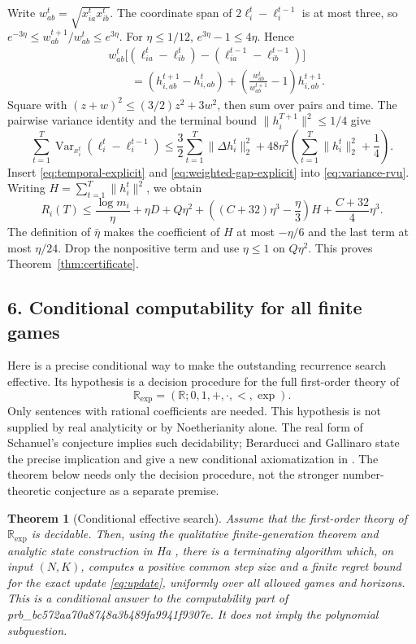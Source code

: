 \documentclass[11pt]{article}
\newtheorem{theorem}{Theorem}
\newcommand{\Var}{\operatorname{Var}}
\newcommand{\norm}[1]{\lVert #1\rVert}
\begin{document}
Write $w_{ab}^t=\sqrt{x_{ia}^tx_{ib}^t}$. The coordinate span of
$2\ell_i^t-\ell_i^{t-1}$ is at most three, so
$e^{-3\eta}\leq w_{ab}^{t+1}/w_{ab}^t\leq e^{3\eta}$.
For $\eta\leq1/12$, $e^{3\eta}-1\leq4\eta$. Hence
\begin{align*}
 &w_{ab}^t\bigl[(\ell_{ia}^t-\ell_{ib}^t)
                   -(\ell_{ia}^{t-1}-\ell_{ib}^{t-1})\bigr]\\
 &\qquad=(h_{i,ab}^{t+1}-h_{i,ab}^t)
       +\left(\frac{w_{ab}^t}{w_{ab}^{t+1}}-1\right)h_{i,ab}^{t+1}.
\end{align*}
Square with $(z+w)^2\leq(3/2)z^2+3w^2$, then sum over pairs and time.
The pairwise variance identity and the terminal bound
$\norm{h_i^{T+1}}^2\leq1/4$ give
\begin{equation}\label{eq:weighted-gap-explicit}
 \sum_{t=1}^T\Var_{x_i^t}(\ell_i^t-\ell_i^{t-1})
 \leq\frac32\sum_{t=1}^T\norm{\Delta h_i^t}_2^2
 +48\eta^2\left(\sum_{t=1}^T\norm{h_i^t}_2^2+\frac14\right).
\end{equation}
Insert \eqref{eq:temporal-explicit} and
\eqref{eq:weighted-gap-explicit} into \eqref{eq:variance-rvu}.
Writing $H=\sum_{t=1}^T\norm{h_i^t}^2$, we obtain
\[
 R_i(T)\leq\frac{\log m_i}{\eta}+\eta D+Q\eta^2
 +\left((C+32)\eta^3-\frac\eta3\right)H
 +\frac{C+32}{4}\eta^3.
\]
The definition of $\bar\eta$ makes the coefficient of $H$ at most
$-\eta/6$ and the last term at most $\eta/24$.
Drop the nonpositive term and use $\eta\leq1$ on $Q\eta^2$.
This proves Theorem~\ref{thm:certificate}.

\subsection*{6. Conditional computability for all finite games}
Here is a precise conditional way to make the outstanding recurrence search
effective. Its hypothesis is a decision procedure for the full first-order
theory of
\[
 \mathbb R_{\exp}=(\mathbb R;0,1,+,\cdot,<,\exp).
\]
Only sentences with rational coefficients are needed. This hypothesis is
not supplied by real analyticity or by Noetherianity alone. The real form
of Schanuel's conjecture implies such decidability; Berarducci and
Gallinaro state the precise implication and give a new conditional
axiomatization in \cite{bg}. The theorem below needs only the decision
procedure, not the stronger number-theoretic conjecture as a separate
premise.

\begin{theorem}[Conditional effective search]\label{thm:conditional-search}
Assume that the first-order theory of $\mathbb R_{\exp}$ is decidable.
Then, using the qualitative finite-generation theorem and analytic state
construction in Ha \cite[Theorem 5.5 and Lemmas 5.6--5.8]{ha}, there is a
terminating algorithm which, on input $(N,K)$, computes a positive common
step size and a finite regret bound for the exact update
\eqref{eq:update}, uniformly over all allowed games and horizons.
This is a conditional answer to the computability part of prb_bc572aa70a8748a3b489fa9941f9307e. It
does not imply the polynomial subquestion.
\end{theorem}
\end{document}
